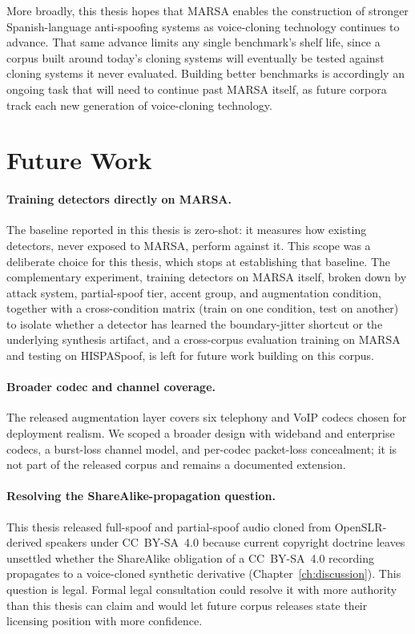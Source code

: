 \documentclass[11pt]{report}
\begin{document}
More broadly, this thesis hopes that MARSA enables the construction of
stronger Spanish-language anti-spoofing systems as voice-cloning
technology continues to advance. That same advance limits any single
benchmark's shelf life, since a corpus built around today's cloning
systems will eventually be tested against cloning systems it never
evaluated. Building better benchmarks is accordingly an ongoing task
that will need to continue past MARSA itself, as future corpora track
each new generation of voice-cloning technology.

\section{Future Work}

\paragraph{Training detectors directly on MARSA.} The baseline reported
in this thesis is zero-shot: it measures how existing detectors, never
exposed to MARSA, perform against it. This scope was a deliberate
choice for this thesis, which stops at establishing that baseline. The
complementary experiment, training detectors on MARSA itself, broken
down by attack system, partial-spoof tier, accent group, and
augmentation condition, together with a cross-condition matrix (train
on one condition, test on another) to isolate whether a detector has
learned the boundary-jitter shortcut or the underlying synthesis
artifact, and a cross-corpus evaluation training on MARSA and testing
on HISPASpoof, is left for future work building on this corpus.

\paragraph{Broader codec and channel coverage.} The
released augmentation layer covers six telephony and VoIP codecs chosen
for deployment realism. We scoped a broader design with wideband and
enterprise codecs, a burst-loss channel model, and per-codec packet-loss
concealment; it is not part of the released corpus and remains a
documented extension.

\paragraph{Resolving the ShareAlike-propagation question.} This
thesis released full-spoof and partial-spoof audio cloned from
OpenSLR-derived speakers under CC~BY-SA~4.0 because current copyright
doctrine leaves unsettled whether the ShareAlike obligation of a
CC~BY-SA~4.0 recording propagates to a voice-cloned synthetic derivative
(Chapter~\ref{ch:discussion}). This question is legal. Formal legal
consultation could resolve it with more authority than this thesis can
claim and would let future corpus releases state their licensing
position with more confidence.
\end{document}
